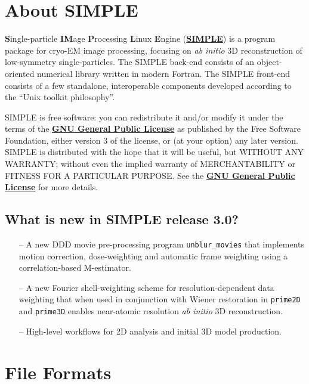\documentclass[a4paper,11pt]{article}
\newcommand{\prgname}[1]{\textcolor{NavyBlue}{\texttt{#1}}}
\begin{document}
\tableofcontents{}
\clearpage

\section{About SIMPLE}

\textbf{S}ingle-particle \textbf{IM}age \textbf{P}rocessing \textbf{L}inux \textbf{E}ngine (\href{www.simplecryoem.com}{\textbf{\textcolor{BurntOrange}{SIMPLE}}}) is a program package for cryo-EM image processing, focusing on \textit{ab initio} 3D reconstruction of low-symmetry single-particles. The SIMPLE back-end consists of an object-oriented numerical library written in modern Fortran. The SIMPLE front-end consists of a few standalone, interoperable components developed according to the ``Unix toolkit philosophy''.

SIMPLE is free software: you can redistribute it and/or modify it under the terms of the \href{http://www.gnu.org/copyleft/gpl.html}{\textbf{\textcolor{BurntOrange}{GNU General Public License}}} as published by the Free Software Foundation, either version 3 of the license, or (at your option) any later version. SIMPLE is distributed with the hope that it will be useful, but WITHOUT ANY WARRANTY; without even the implied warranty of MERCHANTABILITY or FITNESS FOR A PARTICULAR PURPOSE. See the \href{http://www.gnu.org/copyleft/gpl.html}{\textbf{\textcolor{BurntOrange}{GNU General Public License}}} for more details.

\subsection{What is new in SIMPLE release 3.0?}
\begin{itemize}
    \item[--] A new DDD movie pre-processing program \prgname{unblur\_movies} that implements motion correction, dose-weighting \citep{grant2015measuring} and automatic frame weighting using a correlation-based M-estimator. 
    \item[--] A new Fourier shell-weighting scheme for resolution-dependent data weighting that when used in conjunction with Wiener restoration in \prgname{prime2D} and \prgname{prime3D} enables near-atomic resolution \textit{ab initio} 3D reconstruction.
    \item[--] High-level workflows for 2D analysis and initial 3D model production.
\end{itemize}

\section{File Formats}
\end{document}
